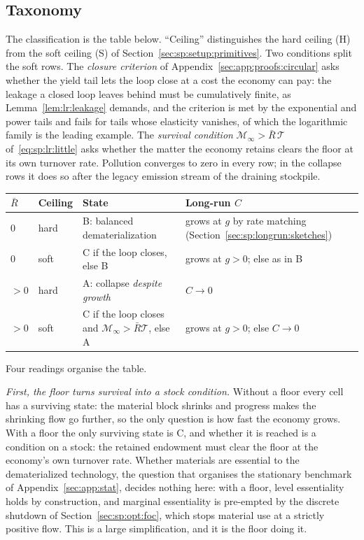 \subsection{Taxonomy}\label{sec:sp:longrun:taxonomy}

The classification is the table below. ``Ceiling'' distinguishes the hard ceiling (H) from the soft ceiling (S) of Section~\ref{sec:sp:setup:primitives}. Two conditions split the soft rows. The \emph{closure criterion} of Appendix~\ref{sec:app:proofs:circular} asks whether the yield tail lets the loop close at a cost the economy can pay: the leakage a closed loop leaves behind must be cumulatively finite, as Lemma~\ref{lem:lr:leakage} demands, and the criterion is met by the exponential and power tails and fails for tails whose elasticity vanishes, of which the logarithmic family is the leading example. The \emph{survival condition} $\mathcal M_\infty>\bar R\,\mathcal T$ of~\eqref{eq:sp:lr:little} asks whether the matter the economy retains clears the floor at its own turnover rate. Pollution converges to zero in every row; in the collapse rows it does so after the legacy emission stream of the draining stockpile.

\begin{center}
\begin{tabular}{llll}
\toprule
$\bar R$ & Ceiling & State & Long-run $C$ \\
\midrule
$0$ & hard & B: balanced dematerialization & grows at $g$ by rate matching (Section~\ref{sec:sp:longrun:sketches}) \\
$0$ & soft & C if the loop closes, else B & grows at $g>0$; else as in B \\
\midrule
$>0$ & hard & A: collapse \emph{despite growth} & $C\to0$ \\
$>0$ & soft & C if the loop closes and $\mathcal M_\infty>\bar R\mathcal T$, else A & grows at $g>0$; else $C\to0$ \\
\bottomrule
\end{tabular}
\end{center}

Four readings organise the table.

\emph{First, the floor turns survival into a stock condition.} Without a floor every cell has a surviving state: the material block shrinks and progress makes the shrinking flow go further, so the only question is how fast the economy grows. With a floor the only surviving state is C, and whether it is reached is a condition on a stock: the retained endowment must clear the floor at the economy's own turnover rate. Whether materials are essential to the dematerialized technology, the question that organises the stationary benchmark of Appendix~\ref{sec:app:stat}, decides nothing here: with a floor, level essentiality holds by construction, and marginal essentiality is pre-empted by the discrete shutdown of Section~\ref{sec:sp:opt:foc}, which stops material use at a strictly positive flow. This is a large simplification, and it is the floor doing it.

